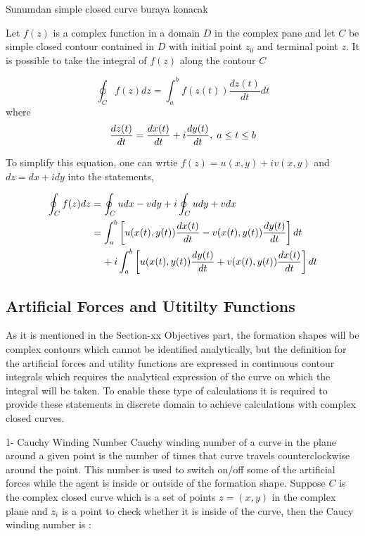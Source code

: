 \documentclass[twoside]{article}
\begin{document}
\begin{multicols}{2}
		Sunumdan simple closed curve buraya konacak
		
		Let $f(z)$ is a complex function in a domain $D$ in the complex pane and let $C$ be simple closed contour contained in $D$ with initial point $z_0$ and terminal point  $z$. It is possible to take the integral of $f(z)$ along the contour $C$
		
		\begin{equation}
    \oint_C f(z) dz = \int_{a}^{b} f(z(t))\frac{dz(t)}{dt} dt
		\end{equation}
		where
		\begin{equation}
\frac{dz(t)}{dt} = \frac{dx(t)}{dt} + i\frac{dy(t)}{dt},   \hspace{0.1cm} a\leq t\leq b
		\end{equation}
		
		To simplify this equation, one can wrtie $f(z) = u(x,y) + iv(x,y)$ and $dz = dx + idy$ into the statements,
		
		\begin{align*}
\oint_C f(z)dz & = \oint_C u dx - v dy + i \oint_C u dy + v dx \\
                        &= \int_{a}^{b}\left[u(x(t),y(t) )\frac{dx(t)}{dt} - v(x(t),y(t) )\frac{dy(t)}{dt}\right]dt\\
                        & \hspace{0.4cm} + i\int_{a}^{b} \left[u(x(t),y(t) )\frac{dy(t)}{dt} + v(x(t),y(t) )\frac{dx(t)}{dt}\right]dt
		\end{align*}
		
     \subsection{Artificial Forces and Utitilty Functions}
		As it is mentioned in the Section-xx Objectives part, the formation shapes will be complex contours which cannot be identified analytically, but the definition for the artificial forces and utility functions are expressed in continuous contour integrals which requires the analytical expression of the curve on which the integral will be taken. To enable these type of calculations it is required to provide these statements in discrete domain to achieve calculations with complex closed curves.

		1- Cauchy Winding Number
		Cauchy winding number of a curve in the plane around a given point is the number of times that curve travels counterclockwise around the point. This number is used to switch on/off some of the artificial forces while the agent is inside or outside of the formation shape. Suppose $C$ is the complex closed curve which is a set of points $z=(x,y)$ in the complex plane  and $z_i$ is a point to check whether it is inside of the curve, then the Caucy winding number is :
					

\end{multicols}
\end{document}
